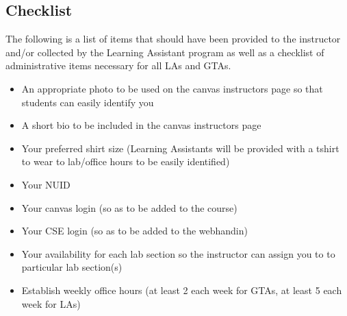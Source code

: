 \documentclass[12pt]{scrartcl}
\begin{document}
\subsection*{Checklist}

The following is a list of items that should have been provided to 
the instructor and/or collected by the Learning Assistant program
as well as a checklist of administrative items necessary for all
LAs and GTAs.

\begin{itemize}
  \item An appropriate photo to be used on the canvas instructors 
    page so that students can easily identify you
  \item A short bio to be included in the canvas instructors page 
  \item Your preferred shirt size (Learning Assistants will be provided
  with a tshirt to wear to lab/office hours to be easily identified)
  \item Your NUID
  \item Your canvas login (so as to be added to the course)
  \item Your CSE login (so as to be added to the webhandin)
  \item Your availability for each lab section so the instructor can 
    assign you to to particular lab section(s) 
  \item Establish weekly office hours (at least 2 each week for 
    GTAs, at least 5 each week for LAs)
\end{itemize}
\end{document}
